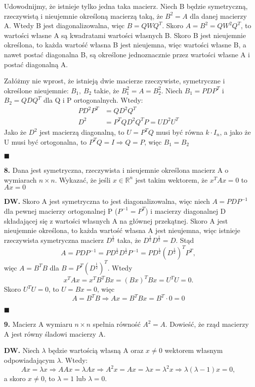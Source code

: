 \documentclass{article}
\begin{document}
Udowodnijmy, że istnieje tylko jedna taka macierz. Niech B będzie symetryczną, rzeczywistą i nieujemnie określoną macierzą taką, że $B^2=A$ dla danej macierzy A. Wtedy B jest diagonalizowalna, więc $B=QWQ^T$. Skoro $A=B^2=QW^2Q^T$, to wartości własne A są kwadratami wartości własnych B. Skoro B jest nieujemnie określona, to każda wartość własna B jest nieujemna, więc wartości własne B, a nawet postać diagonalna B, są określone jednoznacznie przez wartości własne A i postać diagonalną A.

Załóżmy nie wprost, że istnieją dwie macierze rzeczywiste, symetryczne i określone nieujemnie: $B_1,\ B_2$ takie, że $B_1^2=A=B_2^2$. Niech $B_1=PDP^T$ i $B_2=QDQ^T$ dla Q i P ortogonalnych. Wtedy: 
\begin{align*}
PD^2P^T&=QD^2Q^T\\
D^2&=P^TQD^2Q^TP=UD^2U^T
\end{align*} Jako że $D^2$ jest macierzą diagonalną, to $U=P^TQ$ musi być równa $k\cdot I_n$, a jako że U musi być ortogonalna, to $P^TQ=I\Rightarrow Q=P$, więc $B_1=B_2$ 
\begin{flushright}
$\blacksquare$
\end{flushright}
\begin{center}
\large\textbf{8.} Dana jest symetryczna, rzeczywista i nieujemnie określona macierz A o wymiarach $n\times n$. Wykazać, że jeśli $x\in\mathds{R}^n$ jest takim wektorem, że $x^TAx=0$ to $Ax=0$
\end{center}
\textbf{DW.} Skoro A jest symetryczna to jest diagonalizowalna, więc niech $A=PDP^{-1}$ dla pewnej macierzy ortogonalnej P ($P^{-1}=P^T$) i macierzy diagonalnej D składającej się z wartości własnych A na głównej przekątnej. Skoro A jest nieujemnie określona, to każda wartość własna A jest nieujemna, więc istnieje rzeczywista symetryczna macierz $D^{\frac{1}{2}}$ taka, że $D^{\frac{1}{2}}D^{\frac{1}{2}}=D$. Stąd $$A=PDP^{-1}=PD^{\frac{1}{2}}D^{\frac{1}{2}}P^{-1}=PD^{\frac{1}{2}}(D^{\frac{1}{2}})^T P^T,$$
więc $A=B^TB$ dla $B=P^T(D^{\frac{1}{2}})^T$. Wtedy
$$x^TAx=x^TB^TBx=(Bx)^TBx=U^TU=0.$$
Skoro $U^TU=0$, to $U=Bx=0$, więc 
$$A=B^TB\Rightarrow Ax=B^TBx=B^T\cdot0=0$$
\begin{flushright}
$\blacksquare$
\end{flushright}

\begin{center}
\large \textbf{9.} Macierz A wymiaru $n\times n$ spełnia równość $A^2=A$. Dowieść, że rząd macierzy A jest równy śladowi macierzy A.
\end{center}
\textbf{DW.} Niech $\lambda$ będzie wartością własną A oraz $x\neq0$ wektorem własnym odpowiadającym $\lambda$. Wtedy:
$$Ax=\lambda x\Rightarrow AAx=\lambda Ax\Rightarrow A^2x=Ax=\lambda x=\lambda^2x\Rightarrow\lambda(\lambda-1)x=0,$$
a skoro $x\neq0$, to $\lambda=1$ lub $\lambda=0$.
\end{document}
